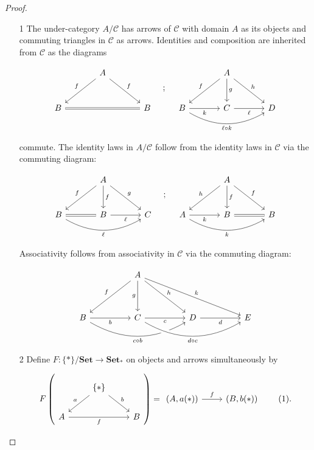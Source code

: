 \documentclass[11pt]{amsart}
\theoremstyle{plain}
\theoremstyle{definition}
\newcommand{\cC}{{\mathcal C}}
\newcommand{\Set}{{\mathbf{Set}}}
\newcommand{\noi}{{\noindent}}
\begin{document}
\begin{proof}\
\begin{enumerate}
\item[1] 
The under-category $A/\cC$ has arrows of $\cC$ with domain $A$ as its objects and commuting triangles in $\cC$ as arrows. Identities and composition are inherited from $\cC$ as the diagrams

\[\begin{tikzcd}[column sep = large, row sep = large]
& A \ar[dr,"f"] \ar[dl,"f"'] & \\
B \rar[rr,equals] & & B
\end{tikzcd}\quad ; \quad 
\begin{tikzcd}[column sep = large, row sep = large]
& \ar[dl, "f"'] \ar[d, "g"] A \ar[dr, "h"] & \\
B \rar["k"'] \ar[rr, bend right, "\ell \circ k"'] & C \rar["\ell"'] &  D 
\end{tikzcd}\]

\noi commute. The identity laws in $A/\cC$ follow from the identity laws in $\cC$ via the commuting diagram:

\[
\begin{tikzcd}[column sep = large, row sep = large]
& \ar[dl, "f"'] \ar[d, "f"] A \ar[dr, "g"] & \\
B \rar[equals] \ar[rr, bend right, " \ell"'] & B \rar["\ell"'] &  C
\end{tikzcd}
\quad ; \quad 
\begin{tikzcd}[column sep = large, row sep = large]
& \ar[dl, "h"'] \ar[d, "f"] A \ar[dr, "f"] & \\
A \rar["k"'] \ar[rr, bend right, " k"'] & B \rar[equals] &  B 
\end{tikzcd}\]

\noi Associativity follows from associativity in $\cC$ via the commuting diagram:

\[ \begin{tikzcd}[column sep = huge, row sep = huge]
& A \ar[dl, "f"'] \dar["g"'] \ar[dr, "h"] \ar[drr, "k"] &&   \\
B \rar["b"'] \ar[rr, bend right, "c \circ b"'] & C \rar["c"'] \ar[rr, bend right, crossing over, "d \circ c"'] & D \rar["d"'] & E 
\end{tikzcd}\]\medskip

\item[2]
Define $F: \{*\}/\Set \to \Set_*$ on objects and arrows simultaneously by  

\[ \label{F1} 
F\left( \begin{tikzcd}
& \{*\} \ar[dl, "a"'] \ar[dr, "b"] & \\
A \rar[rr,"f"'] && B
\end{tikzcd} \right) =  
\begin{tikzcd}
(A,a(*)) \rar["f"] & (B,b(*)) 
\end{tikzcd} \tag{1}
.\]


\end{enumerate}
\end{proof}
\end{document}
